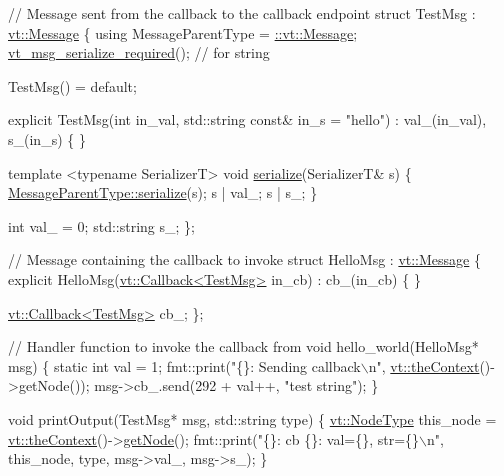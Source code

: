 \begin{DoxyCodeInclude}
\textcolor{comment}{// Message sent from the callback to the callback endpoint}
\textcolor{keyword}{struct }TestMsg : \hyperlink{structvt_1_1messaging_1_1_active_msg}{vt::Message} \{
  \textcolor{keyword}{using} MessageParentType = \hyperlink{namespacevt_a3a3ddfef40b4c90915fa43cdd5f129ea}{::vt::Message};
  \hyperlink{message__serialize_8h_a54128d5338aaa9c918179826085e13d1}{vt\_msg\_serialize\_required}(); \textcolor{comment}{// for string}

  TestMsg() = \textcolor{keywordflow}{default};

  \textcolor{keyword}{explicit} TestMsg(\textcolor{keywordtype}{int} in\_val, std::string \textcolor{keyword}{const}& in\_s = \textcolor{stringliteral}{"hello"})
    : val\_(in\_val),
      s\_(in\_s)
  \{ \}

  \textcolor{keyword}{template} <\textcolor{keyword}{typename} SerializerT>
  \textcolor{keywordtype}{void} \hyperlink{structvt_1_1messaging_1_1_active_msg_a758f02bef5991c48d6c9a56c30ca7ad9}{serialize}(SerializerT& s) \{
    \hyperlink{namespacecheckpoint_a075da4e7344cf037943362517e606c3a}{MessageParentType::serialize}(s);
    s | val\_;
    s | s\_;
  \}

  \textcolor{keywordtype}{int} val\_ = 0;
  std::string s\_;
\};

\textcolor{comment}{// Message containing the callback to invoke}
\textcolor{keyword}{struct }HelloMsg : \hyperlink{structvt_1_1messaging_1_1_active_msg}{vt::Message} \{
  \textcolor{keyword}{explicit} HelloMsg(\hyperlink{structvt_1_1pipe_1_1callback_1_1cbunion_1_1_callback_typed}{vt::Callback<TestMsg>} in\_cb)
    : cb\_(in\_cb)
  \{ \}

  \hyperlink{structvt_1_1pipe_1_1callback_1_1cbunion_1_1_callback_typed}{vt::Callback<TestMsg>} cb\_;
\};

\textcolor{comment}{// Handler function to invoke the callback from}
\textcolor{keywordtype}{void} hello\_world(HelloMsg* msg) \{
  \textcolor{keyword}{static} \textcolor{keywordtype}{int} val = 1;
  fmt::print(\textcolor{stringliteral}{"\{\}: Sending callback\(\backslash\)n"}, \hyperlink{namespacevt_a26551fe0e6e6a1371111df5b12c7e92c}{vt::theContext}()->getNode());
  msg->cb\_.send(292 + val++, \textcolor{stringliteral}{"test string"});
\}

\textcolor{keywordtype}{void} printOutput(TestMsg* msg, std::string type) \{
  \hyperlink{namespacevt_a866da9d0efc19c0a1ce79e9e492f47e2}{vt::NodeType} this\_node = \hyperlink{namespacevt_a26551fe0e6e6a1371111df5b12c7e92c}{vt::theContext}()->\hyperlink{structvt_1_1ctx_1_1_context_a0d52c263ce8516546a67443d9a86fa5f}{getNode}();
  fmt::print(\textcolor{stringliteral}{"\{\}: cb \{\}: val=\{\}, str=\{\}\(\backslash\)n"}, this\_node, type, msg->val\_, msg->s\_);
\}


\end{DoxyCodeInclude}
